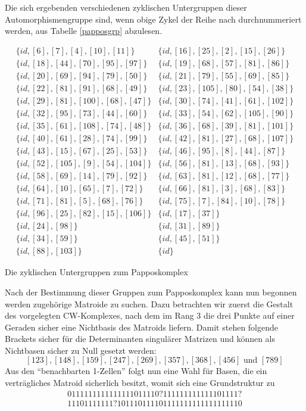 Die sich ergebenden verschiedenen zyklischen Untergruppen dieser
Automorphismengruppe sind, wenn obige Zykel der Reihe nach durchnummeriert
werden, aus Tabelle \ref{papposgrp} abzulesen.

\begin{table}%
{\footnotesize $$\begin{array}{ll}
\{id,[6],[7],[4],[10],[11]\} & \{id,[16],[25],[2],[15],[26]\}\\
\{id,[18],[44],[70],[95],[97]\} & \{id,[19],[68],[57],[81],[86]\}\\
\{id,[20],[69],[94],[79],[50]\} & \{id,[21],[79],[55],[69],[85]\}\\
\{id,[22],[81],[91],[68],[49]\} & \{id,[23],[105],[80],[54],[38]\}\\
\{id,[29],[81],[100],[68],[47]\} & \{id,[30],[74],[41],[61],[102]\}\\
\{id,[32],[95],[73],[44],[60]\} & \{id,[33],[54],[62],[105],[90]\}\\
\{id,[35],[61],[108],[74],[48]\} & \{id,[36],[68],[39],[81],[101]\}\\
\{id,[40],[61],[28],[74],[99]\} & \{id,[42],[81],[27],[68],[107]\}\\
\{id,[43],[15],[67],[25],[53]\} & \{id,[46],[95],[8],[44],[87]\}\\
\{id,[52],[105],[9],[54],[104]\} & \{id,[56],[81],[13],[68],[93]\}\\
\{id,[58],[69],[14],[79],[92]\} & \{id,[63],[81],[12],[68],[77]\}\\
\{id,[64],[10],[65],[7],[72]\} & \{id,[66],[81],[3],[68],[83]\}\\
\{id,[71],[81],[5],[68],[76]\} & \{id,[75],[7],[84],[10],[78]\}\\
\{id,[96],[25],[82],[15],[106]\} & \{id,[17],[37]\}\\
\{id,[24],[98]\} & \{id,[31],[89]\}\\
\{id,[34],[59]\} & \{id,[45],[51]\}\\
\{id,[88],[103]\} & \{id\}
\end{array}$$}
\caption{Die zyklischen Untergruppen zum Papposkomplex}
\label{papposgrp}
\end{table}

Nach der Bestimmung dieser Gruppen zum Papposkomplex kann nun begonnen werden
zugehörige Matroide zu suchen. Dazu betrachten wir zuerst die Gestalt des
vorgelegten CW-Komplexes, nach dem im Rang 3 die drei Punkte auf einer Geraden
sicher eine Nichtbasis des Matroids liefern. Damit stehen folgende Brackets
sicher für die Determinanten singulärer Matrizen und können als Nichtbasen
sicher zu Null gesetzt werden:
$$[123],[148],[159],[247],[269],[357],[368],[456]\mbox{ und }[789]$$
Aus den "`benachbarten 1-Zellen"' folgt nun eine Wahl für Basen, die
ein verträgliches Matroid sicherlich besitzt, womit sich eine
Grundstruktur zu
{\tt $$
\begin{array}{c}
0111111111111111011110?111111111111101111?\\
11101111111?101110111101111111111111111110
\end{array}
$$}

